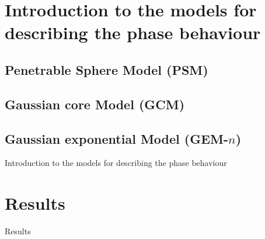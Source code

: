 \documentclass{beamer}
\begin{document}
\section{Introduction to the models for describing the phase behaviour}

\subsection{Penetrable Sphere Model (PSM) }
\subsection{Gaussian core Model (GCM) }
\subsection{Gaussian exponential Model (GEM-$n$)}

\begin{frame}{Introduction to the models for describing the phase behaviour}
	
\end{frame}

\section{Results}
\begin{frame}{Results}
	
\end{frame}
\end{document}
